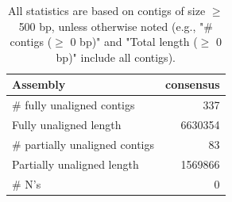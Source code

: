 \documentclass[12pt,a4paper]{article}
\begin{document}
\begin{table}[ht]
\begin{center}
\caption{All statistics are based on contigs of size $\geq$ 500 bp, unless otherwise noted (e.g., "\# contigs ($\geq$ 0 bp)" and "Total length ($\geq$ 0 bp)" include all contigs).}
\begin{tabular}{|l*{1}{|r}|}
\hline
Assembly & consensus \\ \hline
\# fully unaligned contigs & 337 \\ \hline
Fully unaligned length & 6630354 \\ \hline
\# partially unaligned contigs & 83 \\ \hline
Partially unaligned length & 1569866 \\ \hline
\# N's & 0 \\ \hline
\end{tabular}
\end{center}
\end{table}
\end{document}
